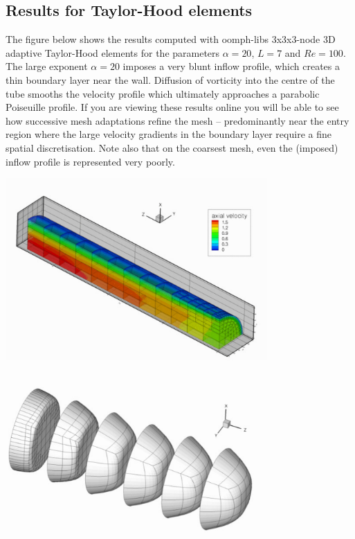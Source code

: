 

\hypertarget{index_results}{}\subsection{Results for Taylor-\/\+Hood elements}\label{index_results}
The figure below shows the results computed with {\ttfamily oomph-\/lib\textquotesingle{}s} 3x3x3-\/node 3D adaptive Taylor-\/\+Hood elements for the parameters $ \alpha=20$, $ L=7$ and $Re=100 $. The large exponent $ \alpha=20$ imposes a very blunt inflow profile, which creates a thin boundary layer near the wall. Diffusion of vorticity into the centre of the tube smooths the velocity profile which ultimately approaches a parabolic Poiseuille profile. If you are viewing these results online you will be able to see how successive mesh adaptations refine the mesh -- predominantly near the entry region where the large velocity gradients in the boundary layer require a fine spatial discretisation. Note also that on the coarsest mesh, even the (imposed) inflow profile is represented very poorly.

 
\begin{DoxyImage}
\includegraphics[width=0.75\textwidth]{axial_veloc}
\end{DoxyImage}
  
\begin{DoxyImage}
\includegraphics[width=0.75\textwidth]{full_profiles}
\end{DoxyImage}




